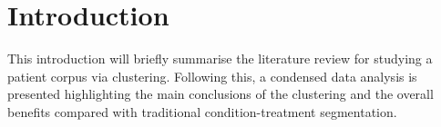\section{Introduction}\label{sec:intro}

This introduction will briefly summarise the literature review for studying a
patient corpus via clustering. Following this, a condensed data analysis is
presented highlighting the main conclusions of the clustering and the overall
benefits compared with traditional condition-treatment segmentation.
